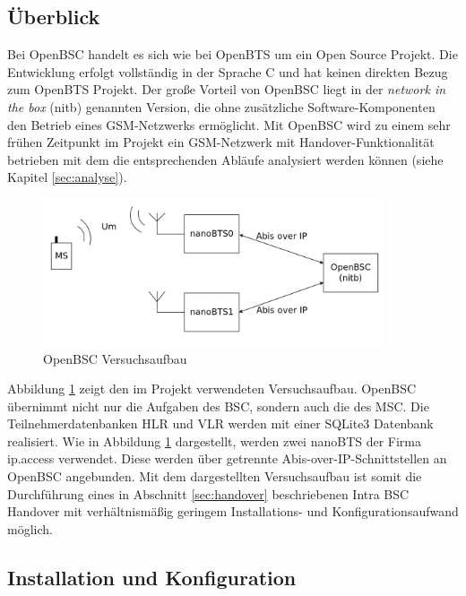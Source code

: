 \label{sec:openbsc}

\subsection{Überblick}

Bei OpenBSC handelt es sich wie bei OpenBTS um ein Open Source Projekt. Die Entwicklung erfolgt vollständig in der Sprache C und hat keinen direkten Bezug zum OpenBTS Projekt. Der große Vorteil von OpenBSC liegt in der \textit{network in the box} (nitb) genannten Version, die ohne zusätzliche Software-Komponenten den Betrieb eines GSM-Netzwerks ermöglicht. Mit OpenBSC wird zu einem sehr frühen Zeitpunkt im Projekt ein GSM-Netzwerk mit Handover-Funktionalität betrieben mit dem die entsprechenden Abläufe analysiert werden können (siehe Kapitel \ref{sec:analyse}).

\begin{figure}[h!]
  \centering
  \includegraphics[width=0.9\textwidth]{img/openbscarch}
  \caption{OpenBSC Versuchsaufbau}
  \label{fig:openbscarch}
\end{figure}

Abbildung \ref{fig:openbscarch} zeigt den im Projekt verwendeten Versuchsaufbau. OpenBSC übernimmt nicht nur die Aufgaben des BSC, sondern auch die des MSC. Die Teilnehmerdatenbanken HLR und VLR werden mit einer SQLite3 Datenbank realisiert. Wie in Abbildung \ref{fig:openbscarch} dargestellt, werden zwei nanoBTS der Firma ip.access verwendet. Diese werden über getrennte Abis-over-IP-Schnittstellen an OpenBSC angebunden. Mit dem dargestellten Versuchsaufbau ist somit die Durchführung eines in Abschnitt \ref{sec:handover} beschriebenen Intra BSC Handover mit verhältnismäßig geringem Installations- und Konfigurationsaufwand möglich.

\subsection{Installation und Konfiguration}

